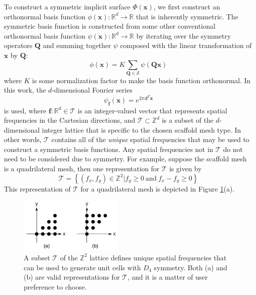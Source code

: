 \documentclass[acmtog]{acmart}
\begin{document}
To construct a symmetric implicit surface $\Phi(\mathbf{x})$, we first construct an orthonormal basis function $\phi(\mathbf{x}): \mathbb{R}^d \rightarrow \mathbb{R}$ that is inherently symmetric. The symmetric basis function is constructed from some other conventional orthonormal basis function $\psi(\mathbf{x}): \mathbb{R}^d \rightarrow \mathbb{R}$ by iterating over the symmetry operators $\mathbf{Q}$ and summing together $\psi$ composed with the linear transformation of $\mathbf{x}$ by $\mathbf{Q}$:
%
\begin{equation}
  \label{eq:basis_function}
  \phi(\mathbf{x}) = K \sum\limits_{\mathbf{Q} \in \mathcal{S}} \psi(\mathbf{Qx})
\end{equation}
%
where $K$ is some normalization factor to make the basis function orthonormal. In this work, the $d$-dimensional Fourier series
%
\begin{equation}
  \label{eq:fourier_series}
  \psi_{\mathbf{f}}(\mathbf{x}) = e^{2\pi i \mathbf{f}^T \mathbf{x}}
\end{equation}
%
is used, where $\mathbf{f}: \mathbb{R}^d \in \mathcal{T}$ is an integer-valued vector that represents spatial frequencies in the Cartesian directions, and $\mathcal{T} \subset \mathbb{Z}^d$ is a subset of the $d$-dimensional integer lattice that is specific to the chosen scaffold mesh type. In other words, $\mathcal{T}$ contains all of the \textit{unique} spatial frequencies that may be used to construct a symmetric basis functions. Any spatial frequencies not in $\mathcal{T}$ do not need to be considered due to symmetry. For example, suppose the scaffold mesh is a quadrilateral mesh, then one representation for $\mathcal{T}$ is given by
%
\begin{equation}
  \mathcal{T} = \left\{ (f_x, f_y) \in \mathbb{Z}^2 | f_y \geq 0 \: \text{and} \: f_x - f_y \geq 0 \right\}
\end{equation}
%
This representation of $\mathcal{T}$ for a quadrilateral mesh is depicted in Figure \ref{fig:unique_freqs_quad}(a).
%
\begin{figure}
  \centering
  \includegraphics[width=0.45\textwidth]{figures/quad_z_lattice_points.pdf}
  \caption{A subset $\mathcal{T}$ of the $\mathbb{Z}^2$ lattice defines unique spatial frequencies that can be used to generate unit cells with $D_4$ symmetry. Both (a) and (b) are valid representations for $\mathcal{T}$, and it is a matter of user preference to choose.}
  \label{fig:unique_freqs_quad}
\end{figure}
\end{document}
